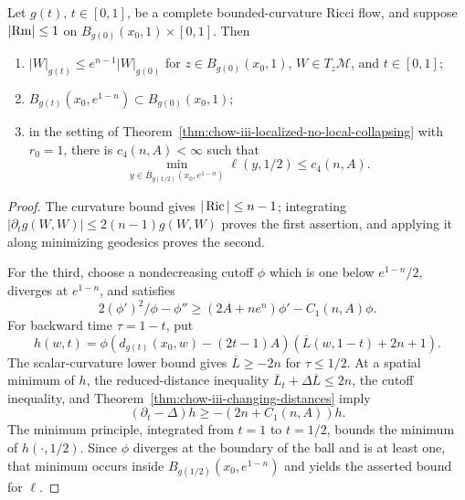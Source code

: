 \begin{lemma}
\label{lem:chow-iii-localized-reduced-distance-control}


Let \(g(t)\), \(t\in[0,1]\), be a complete bounded-curvature Ricci flow, and
suppose
\(\lvert\operatorname{Rm}\rvert\le1\) on \(B_{g(0)}(x_0,1)\times[0,1]\).  Then
\begin{enumerate}
\item \(|W|_{g(t)}\le e^{n-1}|W|_{g(0)}\) for
\(z\in B_{g(0)}(x_0,1)\), \(W\in T_z\mathcal M\), and \(t\in[0,1]\);
\item \(B_{g(t)}(x_0,e^{1-n})\subset B_{g(0)}(x_0,1)\);
\item in the setting of Theorem~\ref{thm:chow-iii-localized-no-local-collapsing}
with \(r_0=1\), there is \(c_4(n,A)<\infty\) such that
\[
 \min_{y\in\overline B_{g(1/2)}(x_0,e^{1-n})}\ell(y,1/2)\le c_4(n,A).
\]
\end{enumerate}
\end{lemma}
\begin{proof}
\sketch The curvature bound gives \(|\operatorname{Ric}|\le n-1\); integrating
\(|\partial_tg(W,W)|\le2(n-1)g(W,W)\) proves the first assertion, and applying
it along minimizing geodesics proves the second.

For the third, choose a nondecreasing cutoff \(\phi\) which is one below
\(e^{1-n}/2\), diverges at \(e^{1-n}\), and satisfies
\[
 2(\phi')^2/\phi-\phi''\ge(2A+ne^n)\phi'-C_1(n,A)\phi.
\]
For backward time \(\tau=1-t\), put
\[
 h(w,t)=\phi(d_{g(t)}(x_0,w)-(2t-1)A)(\overline L(w,1-t)+2n+1).
\]
The scalar-curvature lower bound gives \(\overline L\ge-2n\) for
\(\tau\le1/2\).  At a spatial minimum of \(h\), the reduced-distance
inequality \(\overline L_t+\Delta\overline L\le2n\), the cutoff inequality,
and Theorem~\ref{thm:chow-iii-changing-distances} imply
\[
 (\partial_t-\Delta)h\ge-(2n+C_1(n,A))h.
\]
The minimum principle, integrated from \(t=1\) to \(t=1/2\), bounds the
minimum of \(h(\cdot,1/2)\).  Since \(\phi\) diverges at the boundary of the
ball and is at least one, that minimum occurs inside
\(B_{g(1/2)}(x_0,e^{1-n})\) and yields the asserted bound for \(\ell\).
\end{proof}

